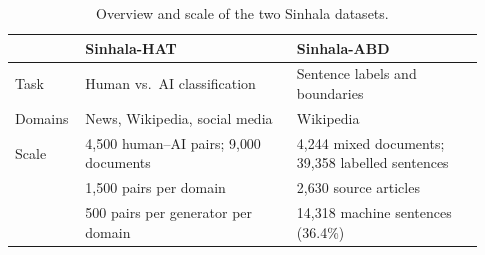 %
%
%


\begin{table}[!b]
\centering\small
\caption{Overview and scale of the two Sinhala datasets.}
\label{tab:overview}
\begin{tabular}{@{}p{0.12\linewidth}p{0.43\linewidth}p{0.38\linewidth}@{}}
\toprule
 & \textbf{Sinhala-HAT} & \textbf{Sinhala-ABD} \\
\midrule
Task & Human vs.\ AI classification & Sentence labels and boundaries \\
Domains & News, Wikipedia, social media & Wikipedia \\
Scale & 4{,}500 human--AI pairs; 9{,}000 documents & 4{,}244 mixed documents; 39{,}358 labelled sentences \\
 & 1{,}500 pairs per domain & 2{,}630 source articles \\
 & 500 pairs per generator per domain & 14{,}318 machine sentences (36.4\%) \\
\bottomrule
\end{tabular}
\end{table}


